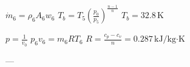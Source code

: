 \( \dot{m}_6 = \rho_6 A_6 w_6 \)  
\( T_b = T_5 \left( \frac{p_0}{p_5} \right)^{\frac{n-1}{n}} \)  
\( T_b = 32.8 \, \text{K} \)

\( p = \frac{1}{v_0} \)  
\( p_6 v_6 = m_6 R T_6 \)  
\( R = \frac{c_p - c_v}{n} = 0.287 \, \text{kJ/kg·K} \)

---